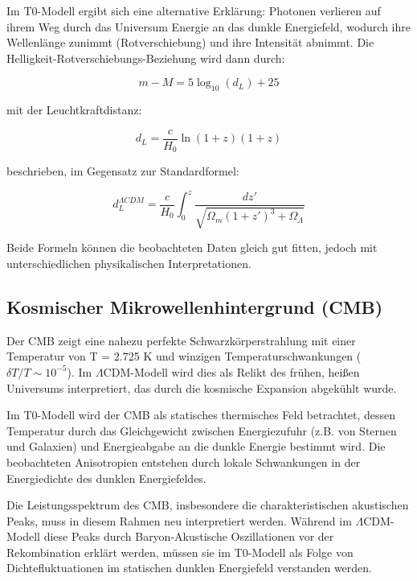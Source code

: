\documentclass[a4paper,12pt]{article}
\begin{document}
Im T0-Modell ergibt sich eine alternative Erklärung: Photonen verlieren auf ihrem Weg durch das Universum Energie an das dunkle Energiefeld, wodurch ihre Wellenlänge zunimmt (Rotverschiebung) und ihre Intensität abnimmt. Die Helligkeit-Rotverschiebungs-Beziehung wird dann durch:

\begin{equation}
	m - M = 5 \log_{10}(d_L) + 25
\end{equation}

mit der Leuchtkraftdistanz:

\begin{equation}
	d_L = \frac{c}{H_0} \ln(1+z) (1+z)
\end{equation}

beschrieben, im Gegensatz zur Standardformel:

\begin{equation}
	d_L^{\Lambda CDM} = \frac{c}{H_0} \int_0^z \frac{dz'}{\sqrt{\Omega_m(1+z')^3 + \Omega_\Lambda}}
\end{equation}

Beide Formeln können die beobachteten Daten gleich gut fitten, jedoch mit unterschiedlichen physikalischen Interpretationen.

\subsection{Kosmischer Mikrowellenhintergrund (CMB)}

Der CMB zeigt eine nahezu perfekte Schwarzkörperstrahlung mit einer Temperatur von T = 2.725 K und winzigen Temperaturschwankungen ($\delta T/T \sim 10^{-5}$). Im $\Lambda$CDM-Modell wird dies als Relikt des frühen, heißen Universums interpretiert, das durch die kosmische Expansion abgekühlt wurde.

Im T0-Modell wird der CMB als statisches thermisches Feld betrachtet, dessen Temperatur durch das Gleichgewicht zwischen Energiezufuhr (z.B. von Sternen und Galaxien) und Energieabgabe an die dunkle Energie bestimmt wird. Die beobachteten Anisotropien entstehen durch lokale Schwankungen in der Energiedichte des dunklen Energiefeldes.

Die Leistungsspektrum des CMB, insbesondere die charakteristischen akustischen Peaks, muss in diesem Rahmen neu interpretiert werden. Während im $\Lambda$CDM-Modell diese Peaks durch Baryon-Akustische Oszillationen vor der Rekombination erklärt werden, müssen sie im T0-Modell als Folge von Dichtefluktuationen im statischen dunklen Energiefeld verstanden werden.
\end{document}
